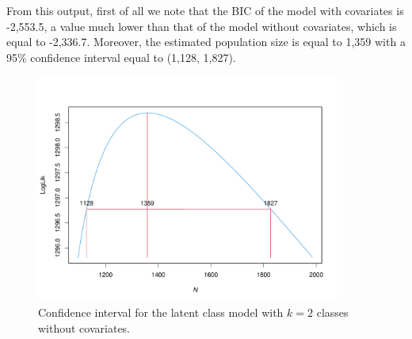 From this output, first of all we note that the BIC of the model with covariates is -2,553.5, a value much lower than that of the model without covariates, which is equal to -2,336.7.
Moreover, the estimated population size is equal to 1,359 with a 95\% confidence interval equal to (1,128, 1,827).

\begin{figure}\centering
\includegraphics[width=10cm]{example_meningits_plot2.pdf}
\caption{Confidence interval for the latent class model with $k=2$ classes without covariates.}\label{fig:CI2}
\end{figure}

